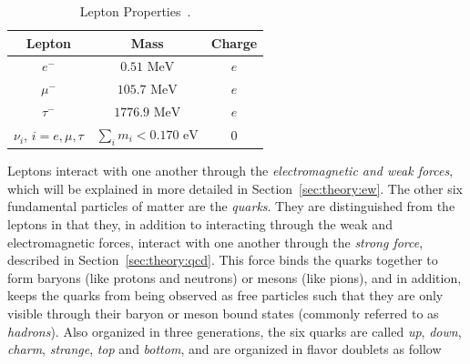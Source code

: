 \begin{table}[h!]
\begin{center}
\begin{tabular}{|c|c|c|}%
\hline
Lepton        & Mass           & Charge \\%
\hline
$e^{-}$      & $0.51 \mbox{ MeV}$      & $e$ \\%
$\mu^{-}$    & $105.7 \mbox{ MeV}$      & $e$ \\%
$\tau^{-}$   & $1776.9 \mbox{ MeV}$     & $e$ \\%
\hline                                      
$\nu_{i}$, $i=e,\mu,\tau$ & $\sum_i m_i < 0.170 \mbox{ eV}$       & $0$ \\%
\hline
\end{tabular}
\end{center}
\caption{Lepton Properties~\cite{Patrignani:2016xqp,refId0}.}
\label{table:theory:lepprop}
\end{table}
Leptons interact with one another through the \emph{electromagnetic and weak forces}, which will be explained in more detailed in Section~\ref{sec:theory:ew}.\newline
The other six fundamental particles of matter are the \emph{quarks}. They are distinguished from the leptons in that they, in addition to interacting through the weak and electromagnetic forces, interact with one another through the \emph{strong force}, described in Section~\ref{sec:theory:qcd}. This force binds the quarks together to form baryons (like protons and neutrons) or mesons (like pions), and in addition, keeps the quarks from being observed as free particles such that they are only visible through their baryon or meson bound states (commonly referred to as \emph{hadrons}). Also organized in three generations, the six quarks are called \textit{up}, \textit{down}, \textit{charm}, \textit{strange}, \textit{top} and \textit{bottom}, and are organized in flavor doublets as follow

